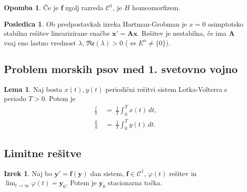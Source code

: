 \documentclass[11pt]{article}
\newcommand{\f}{\mathbf{f}}
\newcommand{\x}{\mathbf{x}}
\newcommand{\y}{\mathbf{y}}
\newcommand{\A}{\mathbf{A}}
\newcommand{\C}{\mathcal{C}}
\newcommand{\set}[1]{\{#1\}}
\newcommand{\re}{\mathfrak{Re}}
\newcommand{\0}{\mathbf{0}}
\theoremstyle{definition}
\theoremstyle{definition}
\theoremstyle{definition}
\newtheorem{izrek}{Izrek}[section]
\theoremstyle{definition}
\newtheorem*{posledica}{Posledica}
\newtheorem*{opomba}{Opomba}
\newtheorem{lema}{Lema}
\begin{document}
\begin{opomba}

Če je $\f$ zgolj razreda $\C^1$, je $H$ homeomorfizem.

\end{opomba}
\vspace{0.5cm}

\begin{posledica}

Ob predpostavkah izreka Hartman-Grobman je $x=0$ asimptotsko stabilna rešitev linearizirane enačbe $\x' = \A\x$. Rešitev je nestabilna, če ima $\A$ vsaj eno lastno vrednost $\lambda$, $\re(\lambda)>0$ ($\iff E^n \neq \set{0})$.

\end{posledica}
\vspace{0.5cm}


\subsection{Problem morskih psov med 1. svetovno vojno}
\vspace{0.5cm}

\begin{lema}

Naj bosta $x(t),y(t)$ periodični rešitvi sistem Lotka-Volterra s periodo $T>0$. Potem je
\begin{align*}
\frac{l}{b} ~&=~ \frac{1}{T}\int_0^T x(t)\,dt, \\
\frac{k}{a} ~&=~ \frac{1}{T}\int_0^T y(t)\,dt.
\end{align*}

\end{lema}
\vspace{0.5cm}


\subsection{Limitne rešitve}
\vspace{0.5cm}

\begin{izrek}

Naj bo $\y' = \f(\y)$ dan sistem, $\f\in\C^1$, $\varphi(t)$ rešitev in \hbox{$\lim_{t \rightarrow \infty} \varphi(t) = \y_0$}. Potem je $\y_0$ stacionarna točka.

\end{izrek}
\vspace{0.5cm}
\end{document}
